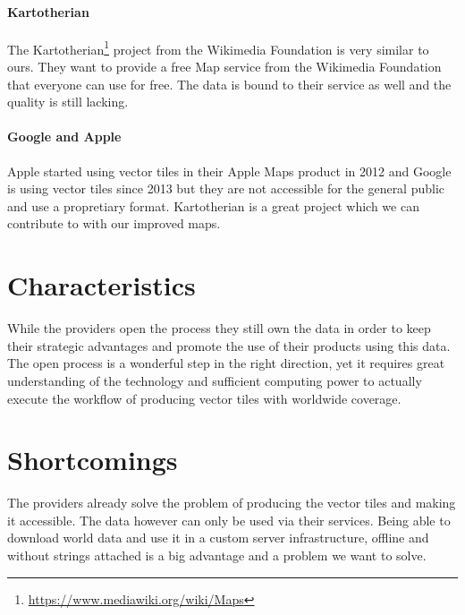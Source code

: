 \paragraph{Kartotherian}

The Kartotherian\footnote{\url{https://www.mediawiki.org/wiki/Maps}} project from the Wikimedia Foundation is very similar to ours. They want to provide a free Map service from the Wikimedia Foundation that everyone can use for free. The data is bound to their service as well and the quality is still lacking.

\paragraph{Google and Apple}

Apple started using vector tiles in their Apple Maps product in 2012\cite{wiki:apple-maps}  and  Google is using vector tiles since 2013\cite{wiki:google-maps} but they are not accessible for the general public and use a propretiary format. Kartotherian is a great project which we can contribute to with
our improved maps.

\section{Characteristics}

While the providers open the process they still own the data in order to keep their strategic advantages and promote the use of their products using this data.
The open process is a wonderful step in the right direction, yet it requires great understanding
of the technology and sufficient computing power to actually
execute the workflow of producing vector tiles with worldwide coverage.

\section{Shortcomings}

The providers already solve the problem of producing the vector tiles
and making it accessible. The data however can only be used
via their services.
\newline{}
Being able to download world data and use it in a custom server
infrastructure, offline and without strings attached is a big advantage
and a problem we want to solve.

\newpage